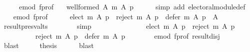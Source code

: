 \begin{isabellebody}
%
\isadelimproof
%
\endisadelimproof
%
\isatagproof
{}\isamarkupfalse%
\ {\isacharminus}{\kern0pt}\isanewline
\ \ \isamarkupfalse%
\ e{\isacharunderscore}{\kern0pt}mod\ f{\isacharunderscore}{\kern0pt}prof\ \isamarkupfalse%
\ {}{\isacharcolon}{\kern0pt}\ {\isachardoublequoteopen}well{\isacharunderscore}{\kern0pt}formed\ A\ {\isacharparenleft}{\kern0pt}m\ A\ p{\isacharparenright}{\kern0pt}{\isachardoublequoteclose}\isanewline
\ \ \ \ \isamarkupfalse%
\ {\isacharparenleft}{\kern0pt}simp\ add{\isacharcolon}{\kern0pt}\ electoral{\isacharunderscore}{\kern0pt}module{\isacharunderscore}{\kern0pt}def{\isacharparenright}{\kern0pt}\isanewline
\ \ \isamarkupfalse%
\ e{\isacharunderscore}{\kern0pt}mod\ f{\isacharunderscore}{\kern0pt}prof\isanewline
\ \ \ \ \isamarkupfalse%
\ {\isachardoublequoteopen}{\isacharparenleft}{\kern0pt}elect\ m\ A\ p{\isacharparenright}{\kern0pt}\ {\isasymunion}\ {\isacharparenleft}{\kern0pt}reject\ m\ A\ p{\isacharparenright}{\kern0pt}\ {\isasymunion}\ {\isacharparenleft}{\kern0pt}defer\ m\ A\ p{\isacharparenright}{\kern0pt}\ {\isacharequal}{\kern0pt}\ A{\isachardoublequoteclose}\isanewline
\ \ \ \ \ \ \isamarkupfalse%
\ result{\isacharunderscore}{\kern0pt}presv{\isacharunderscore}{\kern0pt}alts\isanewline
\ \ \ \ \ \ \isamarkupfalse%
\ simp\isanewline
\ \ \ \ \isamarkupfalse%
\ \isamarkupfalse%
\ {}\ \isamarkupfalse%
\isanewline
\ \ \ \ \ \ {\isachardoublequoteopen}{\isacharparenleft}{\kern0pt}elect\ m\ A\ p{\isacharparenright}{\kern0pt}\ {\isasyminter}\ {\isacharparenleft}{\kern0pt}reject\ m\ A\ p{\isacharparenright}{\kern0pt}\ {\isacharequal}{\kern0pt}\ {\isacharbraceleft}{\kern0pt}{\isacharbraceright}{\kern0pt}\ {\isasymand}\isanewline
\ \ \ \ \ \ \ \ \ \ {\isacharparenleft}{\kern0pt}reject\ m\ A\ p{\isacharparenright}{\kern0pt}\ {\isasyminter}\ {\isacharparenleft}{\kern0pt}defer\ m\ A\ p{\isacharparenright}{\kern0pt}\ {\isacharequal}{\kern0pt}\ {\isacharbraceleft}{\kern0pt}{\isacharbraceright}{\kern0pt}{\isachardoublequoteclose}\isanewline
\ \ \ \ \isamarkupfalse%
\ e{\isacharunderscore}{\kern0pt}mod\ f{\isacharunderscore}{\kern0pt}prof\ result{\isacharunderscore}{\kern0pt}disj\isanewline
\ \ \ \ \isamarkupfalse%
\ blast\isanewline
\ \ \isamarkupfalse%
\ \isamarkupfalse%
\ {\isacharquery}{\kern0pt}thesis\isanewline
\ \ \ \ \isamarkupfalse%
\ blast\isanewline

\end{isabellebody}
